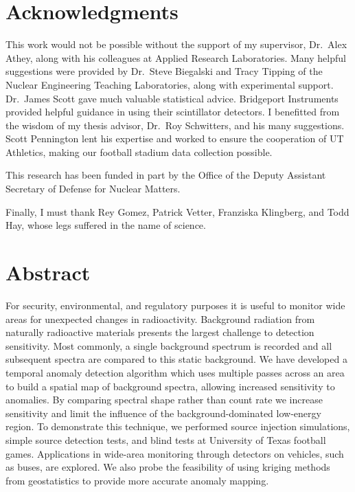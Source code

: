 \documentclass[letterpaper,11pt]{memoir}
\begin{document}
\chapter*{Acknowledgments}

This work would not be possible without the support of my supervisor, Dr.~Alex
Athey, along with his colleagues at Applied Research Laboratories. Many helpful
suggestions were provided by Dr.~Steve Biegalski and Tracy Tipping of the
Nuclear Engineering Teaching Laboratories, along with experimental
support. Dr.~James Scott gave much valuable statistical advice. Bridgeport
Instruments provided helpful guidance in using their scintillator detectors. I
benefitted from the wisdom of my thesis advisor, Dr.~Roy Schwitters, and his
many suggestions. Scott Pennington lent his expertise and worked to ensure the
cooperation of UT Athletics, making our football stadium data collection
possible.

This research has been funded in part by the Office of the Deputy Assistant
Secretary of Defense for Nuclear Matters.

Finally, I must thank Rey Gomez, Patrick Vetter, Franziska Klingberg, and Todd
Hay, whose legs suffered in the name of science.

\cleardoublepage

\chapter*{Abstract}
For security, environmental, and regulatory purposes it is useful to monitor
wide areas for unexpected changes in radioactivity.  Background radiation from
naturally radioactive materials presents the largest challenge to detection
sensitivity.  Most commonly, a single background spectrum is recorded and all
subsequent spectra are compared to this static background. We have developed a
temporal anomaly detection algorithm which uses multiple passes across an area
to build a spatial map of background spectra, allowing increased sensitivity to
anomalies. By comparing spectral shape rather than count rate we increase
sensitivity and limit the influence of the background-dominated low-energy
region. To demonstrate this technique, we performed source injection
simulations, simple source detection tests, and blind tests at University of
Texas football games. Applications in wide-area monitoring through detectors on
vehicles, such as buses, are explored. We also probe the feasibility of using
kriging methods from geostatistics to provide more accurate anomaly mapping.

\cleardoublepage

\tableofcontents

\cleardoublepage














\end{document}
